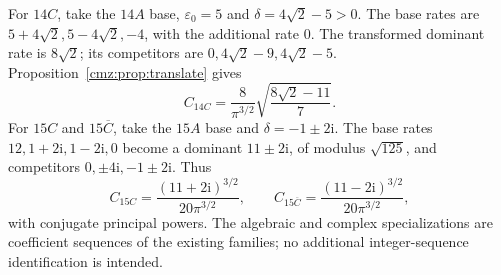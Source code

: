 \documentclass[11pt,letterpaper]{article}
\numberwithin{equation}{section}
\theoremstyle{definition}\newtheorem{definition}[theorem]{Definition}
\theoremstyle{remark}\newtheorem{remark}[theorem]{Remark}
\newcommand{\eps}{\varepsilon}
\newcommand{\ii}{\mathrm i}
\begin{document}
For $14C$, take the $14A$ base, $\eps_0=5$ and $\delta=4\sqrt2-5>0$. The base rates are $5+4\sqrt2,5-4\sqrt2,-4$, with the additional rate $0$. The transformed dominant rate is $8\sqrt2$; its competitors are $0,4\sqrt2-9,4\sqrt2-5$. Proposition~\ref{cmz:prop:translate} gives
\[
C_{14C}=\frac8{\pi^{3/2}}\sqrt{\frac{8\sqrt2-11}{7}}.
\]
For $15C$ and $15\overline C$, take the $15A$ base and $\delta=-1\pm2\ii$. The base rates $12,1+2\ii,1-2\ii,0$ become a dominant $11\pm2\ii$, of modulus $\sqrt{125}$, and competitors $0,\pm4\ii,-1\pm2\ii$. Thus
\begin{equation}
C_{15C}=\frac{(11+2\ii)^{3/2}}{20\pi^{3/2}},\qquad
C_{15\overline C}=\frac{(11-2\ii)^{3/2}}{20\pi^{3/2}},
\label{cmz:eq:complexC}
\end{equation}
with conjugate principal powers. The algebraic and complex specializations are coefficient sequences of the existing families; no additional integer-sequence identification is intended.
\end{document}
